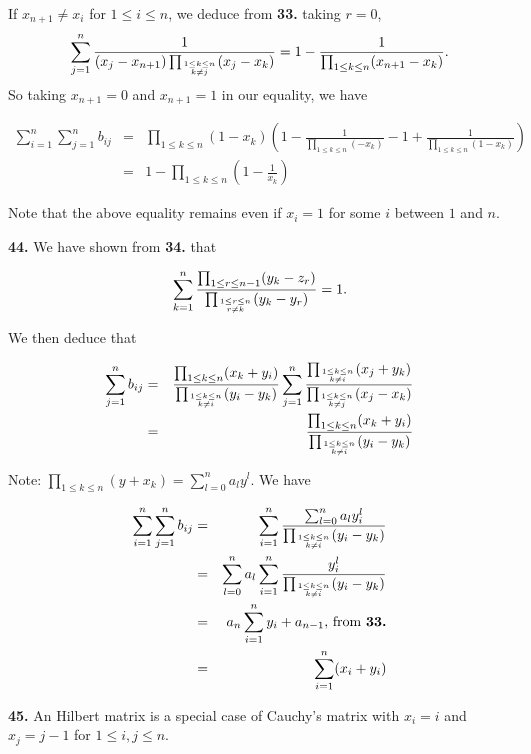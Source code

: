 \documentclass[a4paper,12pt]{article}
\newcommand{\newpar}[1]{\bigskip \noindent \textbf{#1.}}
\begin{document}
If $x_{n+1} \not= x_i$ for $1\le i\le n$, we deduce from \textbf{33.}
taking $r=0$,
\[  \sum_{j=1}^n\frac{1}{(x_j-x_{n+1})\prod_{1\le k\le n\atop k\not=
    j}(x_j - x_k)} =
1 - \frac{1}{\prod_{1\le k\le n}(x_{n+1}-x_k)}.\]
So taking $x_{n+1} = 0$ and $x_{n+1}=1$ in our equality, we have

\begin{eqnarray*}
  \sum_{i=1}^n\sum_{j=1}^nb_{ij} &=&
  \prod_{1\le k\le n}(1-x_k) \left(
  1 - \frac{1}{\prod_{1\le k\le n}(-x_k)} - 1 +
  \frac{1}{\prod_{1\le k\le n}(1-x_k)}\right) \\
  &=& 1 - \prod_{1\le k\le n}\left(1-\frac{1}{x_k}\right)
\end{eqnarray*}

Note that the above equality remains even if $x_i = 1$ for some $i$
between $1$ and $n$.

\newpar{44} We have shown from \textbf{34.} that

\[ \sum_{k=1}^n \frac{\prod_{1\le r\le n-1}(y_k-z_r)}{\prod_{1\le r\le
    n\atop r\not=k}(y_k - y_r)} = 1.\]

We then deduce that

\begin{eqnarray*}
  \sum_{j=1}^n b_{ij} &=&
  \frac{\prod_{1\le k\le n}(x_k + y_i)}{\prod_{1\le k\le n\atop k\not=
      i}(y_i - y_k)}
  \sum_{j=1}^n \frac{\prod_{1\le k\le n\atop
      k\not=i}(x_j+y_k)}{\prod_{1\le k\le n\atop k\not= j}(x_j -
    x_k)}\\ &=&
  \frac{\prod_{1\le k\le n}(x_k + y_i)}{\prod_{1\le k\le n\atop k\not=
      i}(y_i - y_k)}
\end{eqnarray*}

Note: $\prod_{1\le k\le n}(y + x_k) = \sum_{l=0}^n a_l y^l$.  We have

\begin{eqnarray*}
  \sum_{i=1}^n\sum_{j=1}^nb_{ij} &=&
  \sum_{i=1}^n \frac{\sum_{l=0}^n a_l y_i^l}{\prod_{1\le k\le n\atop
      k\not= i}(y_i - y_k)} \\
  &=& \sum_{l=0}^n a_l \sum_{i=1}^n \frac{y_i^l}{\prod_{1\le k\le
      n\atop k\not= i}(y_i - y_k)} \\
  &=& a_n \sum_{i=1}^n y_i + a_{n-1},\,\mbox{from \textbf{33.}} \\
  &=& \sum_{i=1}^n(x_i + y_i)
\end{eqnarray*}

\newpar{45} An Hilbert matrix is a special case of Cauchy's matrix with
$x_i = i$ and $x_j = j-1$ for $1\le i, j\le n$.
\end{document}
